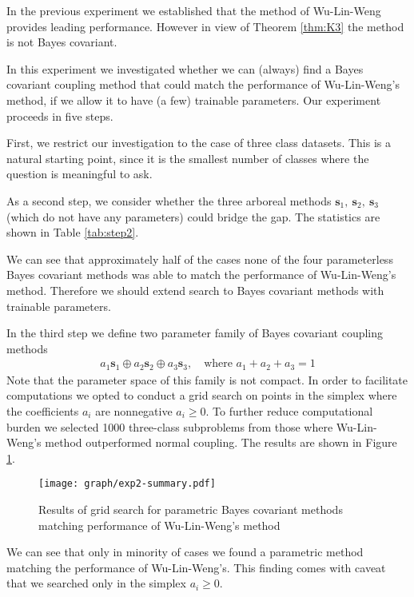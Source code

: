 \documentclass[twoside,11pt]{article}
\begin{document}
In the previous experiment we established that the method of Wu-Lin-Weng provides leading performance. However in view of Theorem \ref{thm:K3} the method is not Bayes covariant. 

In this experiment we investigated whether we can (always) find  a Bayes covariant coupling method that could match the performance of Wu-Lin-Weng's method, if we allow it to have (a few) trainable parameters.  Our experiment proceeds in five steps. 

First, we restrict our investigation to the case of three class datasets. This is a natural starting point, since it is the smallest number of classes where the question is meaningful to ask. 

As a second step, we consider whether the three arboreal methods $ \boldsymbol{s}_1,~ \boldsymbol{s}_2,~ \boldsymbol{s}_3$ (which do not have any parameters) could bridge the gap. The statistics are shown in Table \ref{tab:step2}. 




We can see that approximately half of the cases none of the four parameterless Bayes covariant methods was able to match the performance of Wu-Lin-Weng's method. Therefore we should extend search to Bayes covariant methods with trainable parameters.


In the third step we define two parameter family of Bayes covariant coupling methods
\begin{align}
a_1 \boldsymbol{s}_1 \oplus a_2 \boldsymbol{s}_2 \oplus a_3 \boldsymbol{s}_3,\quad\textrm{where } a_1 + a_2 +a_3 = 1 \label{eq:family}
\end{align}
Note that the parameter space of this family is not compact. In order to facilitate computations we opted to conduct a grid search on points in the simplex where the coefficients $a_i$ are nonnegative $a_i \geq 0$.  To further reduce computational burden we selected 1000 three-class subproblems from those where Wu-Lin-Weng's method outperformed normal coupling. The results are shown in Figure \ref{fig:par-bc}.

\begin{figure}[!ht]
\texttt{[image: graph/exp2-summary.pdf]}
\caption{Results of grid search for parametric Bayes covariant methods matching performance of Wu-Lin-Weng's method}
\label{fig:par-bc}
\end{figure}

We can see that only in minority of cases we found a parametric method matching the performance of Wu-Lin-Weng's. This finding comes with caveat that we searched only in the simplex $a_i \geq 0$. 
\end{document}
